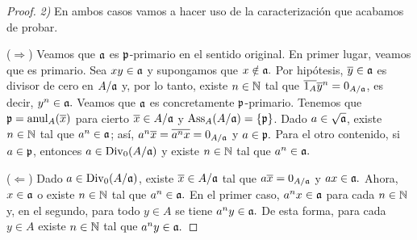 \documentclass[../main.tex]{subfiles}
\begin{document}
\begin{proof}
\textit{2)} En ambos casos vamos a hacer uso de la caracterización que acabamos de probar.

($\Rightarrow$) Veamos que $\mathfrak{a}$ es $\mathfrak{p}$-primario en el sentido original. En primer lugar, veamos que es primario. Sea $xy\in\mathfrak{a}$ y supongamos que $x\notin\mathfrak{a}.$ Por hipótesis, $\overline{y}\in\mathfrak{a}$ es divisor de cero en $A/\mathfrak{a}$ y, por lo tanto, existe $n\in\mathbb{N}$ tal que $\overline{1_A}\overline{y}^n=0_{A/\mathfrak{a}}$, es decir, $y^n\in\mathfrak{a}.$ Veamos que $\mathfrak{a}$ es concretamente $\mathfrak{p}$-primario. Tenemos que $\mathfrak{p}=\operatorname{anul}_A(\overline{x})$ para cierto $\overline{x}\in A/\mathfrak{a}$ y $\text{Ass}_A(A/\mathfrak{a})=\{\mathfrak{p}\}$. Dado $a\in\sqrt{\mathfrak{a}}$, existe $n\in\mathbb{N}$ tal que $a^n\in\mathfrak{a}$; así, $a^n\overline{x}=\overline{a^nx}=0_{A/\mathfrak{a}}$ y $a\in\mathfrak{p}.$ Para el otro contenido, si $a\in\mathfrak{p}$, entonces $a\in\operatorname{Div}_0(A/\mathfrak{a})$ y existe $n\in\mathbb{N}$ tal que $a^n\in\mathfrak{a}.$

($\Leftarrow$) Dado $a\in\operatorname{Div}_0(A/\mathfrak{a})$, existe $\overline{x}\in A/\mathfrak{a}$ tal que $a\overline{x}=0_{A/\mathfrak{a}}$ y $ax\in\mathfrak{a}.$ Ahora, $x\in\mathfrak{a}$ o existe $n\in\mathbb{N}$ tal que $a^n\in\mathfrak{a}.$ En el primer caso, $a^nx\in\mathfrak{a}$ para cada $n\in\mathbb{N}$ y, en el segundo, para todo $y\in A$ se tiene $a^ny\in\mathfrak{a}.$ De esta forma, para cada $y\in A$ existe $n\in\mathbb{N}$ tal que $a^ny\in\mathfrak{a}.$
\end{proof}
\end{document}
